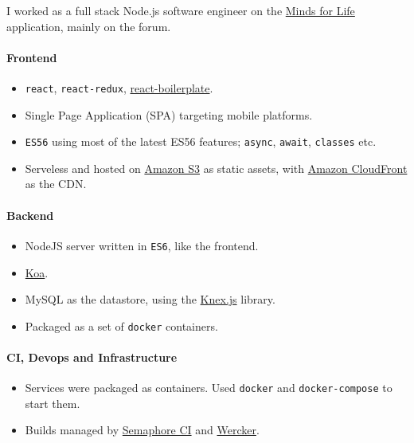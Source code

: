\documentclass[
  a4paper,
  8pt,
]{article}
\providecommand{\tightlist}{%
  \setlength{\itemsep}{0pt}\setlength{\parskip}{0pt}}
\begin{document}
\begin{multicols}{2}
I worked as a full stack Node.js software engineer on the
\href{https://mindsforlife.com/}{Minds for Life} application, mainly on
the forum.

\hypertarget{frontend}{%
\paragraph{Frontend}\label{frontend}}

\begin{itemize}
\tightlist
\item
  \texttt{react}, \texttt{react-redux},
  \href{https://www.reactboilerplate.com/}{react-boilerplate}.
\item
  Single Page Application (SPA) targeting mobile platforms.
\item
  \texttt{ES56} using most of the latest ES56 features; \texttt{async},
  \texttt{await}, \texttt{classes} etc.
\item
  Serveless and hosted on \href{https://aws.amazon.com/s3/}{Amazon S3}
  as static assets, with \href{http://aws.amazon.com/cloudfront/}{Amazon
  CloudFront} as the CDN.
\end{itemize}

\hypertarget{backend}{%
\paragraph{Backend}\label{backend}}

\begin{itemize}
\tightlist
\item
  NodeJS server written in \texttt{ES6}, like the frontend.
\item
  \href{http://koajs.com}{Koa}.
\item
  MySQL as the datastore, using the \href{http://knexjs.org/}{Knex.js}
  library.
\item
  Packaged as a set of \texttt{docker} containers.
\end{itemize}

\hypertarget{ci-devops-and-infrastructure}{%
\paragraph{CI, Devops and
Infrastructure}\label{ci-devops-and-infrastructure}}

\begin{itemize}
\tightlist
\item
  Services were packaged as containers. Used \texttt{docker} and
  \texttt{docker-compose} to start them.
\item
  Builds managed by \href{https://semaphoreci.com}{Semaphore CI} and
  \href{http://www.wercker.com/}{Wercker}.
\end{itemize}


\end{multicols}
\end{document}
